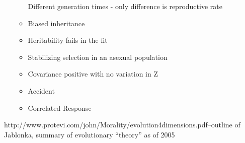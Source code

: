 \begin{itemize}
\begin{itemize}
		Different generation times - only difference is reproductive rate
		
		\item
		
		Biased inheritance
		
		\item
		
		Heritability fails in the fit
		
		\item
		
		Stabilizing selection in an asexual population
		
		\item
		
		Covariance positive with no variation in Z
		
		\item
		
		Accident
		
		\item
		
		Correlated Response
		
	\end{itemize}
\end{itemize}


http://www.protevi.com/john/Morality/evolution4dimensions.pdf--outline of Jablonka, summary of evolutionary ``theory'' as of 2005

